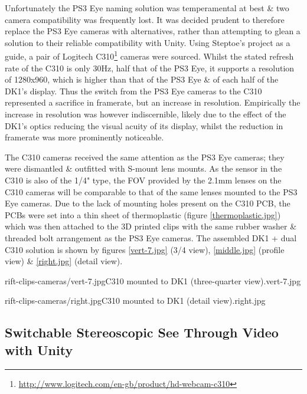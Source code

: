 Unfortunately the PS3 Eye naming solution was temperamental at best \& two camera compatibility was frequently lost. It was decided prudent to therefore replace the PS3 Eye cameras with alternatives, rather than attempting to glean a solution to their reliable compatibility with Unity. Using Steptoe's project as a guide, a pair of Logitech C310\footnote{\url{http://www.logitech.com/en-gb/product/hd-webcam-c310}} cameras were sourced. Whilst the stated refresh rate of the C310 is only 30Hz, half that of the PS3 Eye, it supports a resolution of 1280x960, which is higher than that of the PS3 Eye \& of each half of the DK1's display. Thus the switch from the PS3 Eye cameras to the C310 represented a sacrifice in framerate, but an increase in resolution. Empirically the increase in resolution was however indiscernible, likely due to the effect of the DK1's optics reducing the visual acuity of its display, whilst the reduction in framerate was more prominently noticeable.

The C310 cameras received the same attention as the PS3 Eye cameras; they were dismantled \& outfitted with S-mount lens mounts. As the sensor in the C310 is also of the 1/4" type, the FOV provided by the 2.1mm lenses on the C310 cameras will be comparable to that of the same lenses mounted to the PS3 Eye cameras. Due to the lack of mounting holes present on the C310 PCB, the PCBs were set into a thin sheet of thermoplastic (figure \ref{thermoplastic.jpg}) which was then attached to the 3D printed clips with the same rubber washer \& threaded bolt arrangement as the PS3 Eye cameras. The assembled DK1 + dual C310 solution is shown by figures \ref{vert-7.jpg} (3/4 view), \ref{middle.jpg} (profile view) \& \ref{right.jpg} (detail view).

       {rift-clips-cameras/vert-7.jpg}{C310 mounted to DK1 (three-quarter view).}{vert-7.jpg}

       {rift-clips-cameras/right.jpg}{C310 mounted to DK1 (detail view).}{right.jpg}


\subsection{Switchable Stereoscopic See Through Video with Unity}

